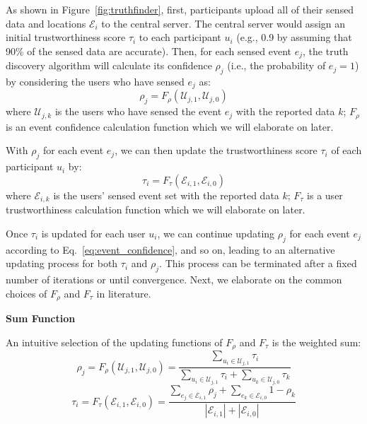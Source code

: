 \documentclass[11pt]{article}
\begin{document}
As shown in Figure~\ref{fig:truthfinder}, first, participants upload all of their sensed data and locations $\mathcal E_i$  to the central server. The central server would assign an initial trustworthiness score $\tau_i$ to each participant $u_i$ (e.g., 0.9 by assuming that 90\% of the sensed data are accurate). Then, for each sensed event $e_j$, the truth discovery algorithm will calculate its confidence $\rho_j$ (i.e., the probability of $e_j = 1$) by considering the users who have sensed $e_j$ as:
\begin{equation}
\rho_j = F_\rho(\mathcal U_{j,1}, \mathcal U_{j,0})
\label{eq:event_confidence}
\end{equation}
where $\mathcal U_{j,k}$ is the users who have sensed the event $e_j$ with the reported data $k$; $F_\rho$ is an event confidence calculation function which we will elaborate on later.

With $\rho_j$ for each event $e_j$, we can then update the trustworthiness score $\tau_i$ of each participant $u_i$ by:
\begin{equation}
\tau_i = F_\tau(\mathcal E_{i,1}, \mathcal E_{i,0})
\end{equation}
where $\mathcal E_{i,k}$ is the users' sensed event set with the reported data $k$; $F_\tau$ is a user trustworthiness calculation function which we will elaborate on later.

Once $\tau_i$ is updated for each user $u_i$, we can continue updating $\rho_j$ for each event $e_j$ according to Eq.~\ref{eq:event_confidence}, and so on, leading to an alternative updating process for both $\tau_i$ and $\rho_j$. This process can be terminated after a fixed number of iterations or until convergence. Next, we elaborate on the common choices of $F_\rho$ and $F_\tau$ in literature.

\textbf{Sum Function}

An intuitive selection of the updating functions of $F_\rho$ and $F_\tau$ is the weighted sum:
\begin{equation}
\rho_j = F_\rho(\mathcal U_{j,1}, \mathcal U_{j,0}) = \frac{\sum_{u_i \in \mathcal U_{j,1}} \tau_i}{\sum_{u_i \in \mathcal U_{j,1}} \tau_i + \sum_{u_k \in \mathcal U_{j,0}} \tau_k}
\label{eq:rho_function_sum}
\end{equation}
\begin{equation}
\tau_i = F_\tau(\mathcal E_{i,1}, \mathcal E_{i,0}) = \frac{\sum_{e_j \in \mathcal E_{i,1}} \rho_j + \sum_{e_k \in \mathcal E_{i,0}} 1-\rho_k}{|\mathcal E_{i,1}|+|\mathcal E_{i,0}|}
\label{eq:tau_function}
\end{equation}
\end{document}
